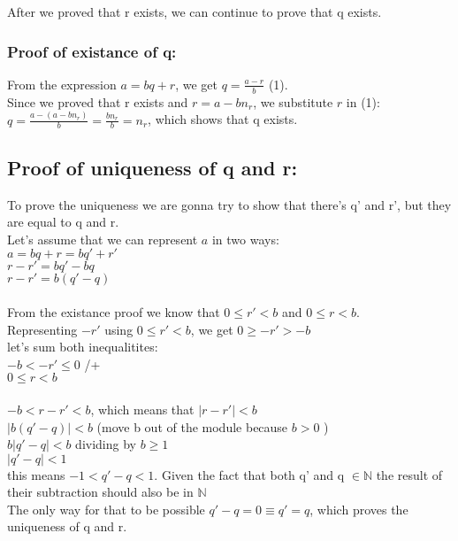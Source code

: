 \documentclass{article}
\begin{document}
After we proved that r exists, we can continue to prove that q exists.\\

\subsubsection*{Proof of existance of q:}
From the expression $a = bq + r$, we get $q = \frac{a - r}{b}$ (1).\\
Since we proved that r exists and $r = a - bn_r$, we substitute $r$ in (1):\\
$q = \frac{a - (a-bn_r)}{b} = \frac{bn_r}{b} = n_r$, which shows that q exists.
\\
\subsection*{Proof of uniqueness of q and r:}
To prove the uniqueness we are gonna try to show that there's q' and r', but they are equal to q and r.\\
Let's assume that we can represent $a$ in two ways:\\
$a = bq + r = bq' + r'$\\
$r - r' = bq' - bq$\\
$r - r' = b(q' -q)$\\
\\
From the existance proof we know that $0 \leq r' < b$ and $0 \leq r < b$.\\
Representing $-r'$ using $0 \leq r' < b$, we get $0 \geq -r' > -b$\\
let's sum both inequalitites:\\
$-b < -r' \leq 0$ /+\\
$0 \leq r < b$\\
\\
$-b < r - r' < b$, which means that $|r - r'| < b$\\
$|b(q' - q)| < b$ (move b out of the module because $b > 0$ )\\
$b|q' - q| < b$ dividing by $b \geq 1$\\
$|q' - q| < 1$\\
this means $-1 < q' - q < 1$. Given the fact that both q' and q $\in \mathbb{N}$ the result of their subtraction should also be in $\mathbb{N}$\\
The only way for that to be possible $q' - q = 0 \equiv q' = q$, which proves the uniqueness of q and r.
\end{document}

